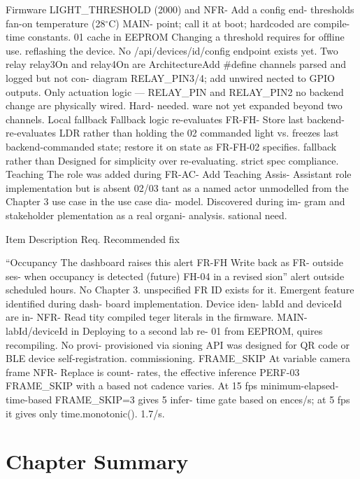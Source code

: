 Firmware LIGHT\_THRESHOLD (2000) and NFR- Add a conﬁg end-
thresholds fan-on temperature (28$^\circ$C) MAIN- point; call it at boot;
hardcoded are compile-time constants. 01 cache in EEPROM
Changing a threshold requires for ofﬂine use.
reﬂashing the device. No
/api/devices/{id}/config
endpoint exists yet.
Two relay relay3On and relay4On are ArchitectureAdd \#define
channels parsed and logged but not con- diagram RELAY\_PIN3/4; add
unwired nected to GPIO outputs. Only actuation logic ---
RELAY\_PIN and RELAY\_PIN2 no backend change
are physically wired. Hard- needed.
ware not yet expanded beyond
two channels.
Local fallback Fallback logic re-evaluates FR-FH- Store last backend-
re-evaluates LDR rather than holding the 02 commanded light
vs. freezes last backend-commanded state; restore it on
state as FR-FH-02 speciﬁes. fallback rather than
Designed for simplicity over re-evaluating.
strict spec compliance.
Teaching The role was added during FR-AC- Add Teaching Assis-
Assistant role implementation but is absent 02/03 tant as a named actor
unmodelled from the Chapter 3 use case in the use case dia-
model. Discovered during im- gram and stakeholder
plementation as a real organi- analysis.
sational need.







Item Description Req. Recommended ﬁx

``Occupancy The dashboard raises this alert FR-FH Write back as FR-
outside ses- when occupancy is detected (future) FH-04 in a revised
sion'' alert outside scheduled hours. No Chapter 3.
unspeciﬁed FR ID exists for it. Emergent
feature identiﬁed during dash-
board implementation.
Device iden- labId and deviceId are in- NFR- Read
tity compiled teger literals in the ﬁrmware. MAIN- labId/deviceId
in Deploying to a second lab re- 01 from EEPROM,
quires recompiling. No provi- provisioned via
sioning API was designed for QR code or BLE
device self-registration. commissioning.
FRAME\_SKIP At variable camera frame NFR- Replace
is count- rates, the effective inference PERF-03 FRAME\_SKIP with a
based not cadence varies. At 15 fps minimum-elapsed-
time-based FRAME\_SKIP=3 gives 5 infer- time gate based on
ences/s; at 5 fps it gives only time.monotonic().
1.7/s.




\section{Chapter Summary}


